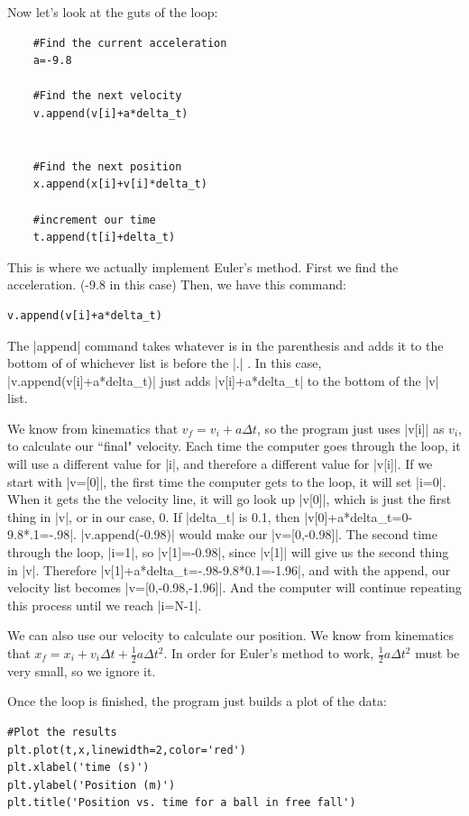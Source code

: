 \documentclass[twoside,11pt,ShortChapTitles]{BYUTextbook}
\begin{document}
Now let's look at the guts of the loop:
\begin{lstlisting}
    #Find the current acceleration
    a=-9.8
    
    #Find the next velocity
    v.append(v[i]+a*delta_t)    
    
    
    #Find the next position
    x.append(x[i]+v[i]*delta_t)
    
    #increment our time
    t.append(t[i]+delta_t)
\end{lstlisting}

This is where we actually implement Euler's method.  First we find the acceleration. (-9.8 in this case) Then, we have this command:
\begin{lstlisting}
v.append(v[i]+a*delta_t)
\end{lstlisting}
The |append| command takes whatever is in the parenthesis and adds it to the bottom of of whichever list is before the |.| . In this case, |v.append(v[i]+a*delta_t)| just adds |v[i]+a*delta_t| to the bottom of the |v| list.  
  
We know from kinematics that $v_f=v_i+a\Delta t$, so the program just uses |v[i]| as $v_i$, to calculate our ``final" velocity.  Each time the computer goes through the loop, it will use a different value for |i|, and therefore a different value for |v[i]|.  
If we start with |v=[0]|, the first time the computer gets to the loop, it will set |i=0|.  When it gets the the velocity line, it will go look up |v[0]|, which is just the first thing in |v|, or in our case, 0.  If |delta_t| is 0.1, then |v[0]+a*delta_t=0-9.8*.1=-.98|.  |v.append(-0.98)| would make our |v=[0,-0.98]|.  The second time through the loop, |i=1|, so |v[1]=-0.98|, since |v[1]| will give us the second thing in |v|.  Therefore |v[1]+a*delta_t=-.98-9.8*0.1=-1.96|, and with the append, our velocity list becomes |v=[0,-0.98,-1.96]|.  And the computer will continue repeating this process until we reach |i=N-1|.

We can also use our velocity to calculate our position.  We know from kinematics that $x_f=x_i+v_i\Delta t+\frac{1}{2}a\Delta t^2$.  In order for Euler's method to work, $\frac{1}{2}a\Delta t^2$ must be very small, so we ignore it.

Once the loop is finished, the program just builds a plot of the data:
\begin{lstlisting}
#Plot the results
plt.plot(t,x,linewidth=2,color='red')
plt.xlabel('time (s)')
plt.ylabel('Position (m)')
plt.title('Position vs. time for a ball in free fall')
\end{lstlisting}
\end{document}
